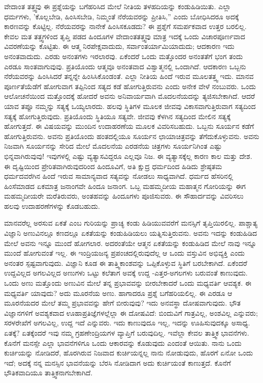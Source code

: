 ವೇದಾಂತ ತತ್ತ್ವವು ಈ ಪ್ರಶ್ನೆಯನ್ನು ಬಗೆಹರಿಸಿದ ಮೇಲೆ ನೀತಿಯ ತಳಹದಿಯನ್ನು ಕಂಡುಹಿಡಿಯಿತು. ಎಲ್ಲಾ ಧರ್ಮಗಳು, 'ಕೊಲ್ಲಬೇಡಿ, ಹಿಂಸಿಸಬೇಡಿ, ನಿಮ್ಮಂತೆ ನೆರೆಯವರನ್ನು ಪ್ರೀತಿಸಿ,'' ಎಂದು ಬೋಧಿಸಿದರೂ ಅದಕ್ಕೆ ಕಾರಣವನ್ನು ಕೊಟ್ಟಿಲ್ಲ. ನೆರೆಯವರನ್ನು ನಾನೇಕೆ ಹಿಂಸಿಸಕೂಡದು? ಈ ಪ್ರಶ್ನೆಗೆ ಸಮರ್ಪಕವಾದ ಉತ್ತರ ಬರಲಿಲ್ಲ. ಕೇವಲ ಮತ ತತ್ತ್ವಗಳಿಂದ ತೃಪ್ತಿ ಪಡದ ಹಿಂದೂಗಳ ವೇದಾಂತತತ್ತ್ವವು ಮಾತ್ರ ಇದಕ್ಕೆ ಒಂದು ವಿಚಾರಪೂರ್ಣವಾದ ವಿವರಣೆಯನ್ನು ಕೊಟ್ಟಿತು. ಈ ಆತ್ಮ ನಿರಪೇಕ್ಷವಾದುದು, ಸರ್ವಾಂತರ್ಯಾಮಿಯಾದುದು; ಆದಕಾರಣ ಇದು ಅನಂತವಾದುದು. ಎರಡು ಅನಂತಗಳು ಇರಲಾರವು. ಏಕೆಂದರೆ ಒಂದು ಮತ್ತೊಂದರ ಅನಂತತೆಗೆ ಭಂಗ ತಂದು ಎರಡೂ ಸಾಂತವಾಗುವುವು. ಪ್ರತಿಯೊಂದು ಆತ್ಮವೂ ಅನಂತವಾದ ವಿಶ್ವಾತ್ಮನಲ್ಲಿ ಒಂದಾಗಿದೆ. ಆದಕಾರಣ ಒಬ್ಬನು ನೆರೆಯವರನ್ನು ಹಿಂಸಿಸಿದರೆ ತನ್ನನ್ನೇ ಹಿಂಸಿಸಿಕೊಂಡಂತೆ. ಎಲ್ಲಾ ನೀತಿಯ ಹಿಂದೆ ಇರುವ ಮೂಲತತ್ತ್ವ ಇದು. ಮಾನವ ಪೂರ್ಣತೆಯೆಡೆಗೆ ಹೋಗುವಾಗ ತಪ್ಪಿನಿಂದ ಸತ್ಯದ ಕಡೆ ಹೋಗುತ್ತಿರುವನು ಎಂದು ಅನೇಕ ವೇಳೆ ನಂಬುವರು. ಒಂದು ಆಲೋಚನೆಯಿಂದ ಮತ್ತೊಂದಕ್ಕೆ ಹೋದರೆ ಅವನು ಅನಿವಾರ್ಯವಾಗಿ ಮೊದಲನೆಯದನ್ನು ತ್ಯಜಿಸಬೇಕಾಗಿದೆ. ಆದರೆ ಯಾವ ತಪ್ಪೂ ನಮ್ಮನ್ನು ಸತ್ಯಕ್ಕೆ ಒಯ್ಯಲಾರದು. ಹಲವು ಸ್ಥಿತಿಗಳ ಮೂಲಕ ಜೀವವು ವಿಕಾಸವಾಗುತ್ತಿರುವಾಗ ಸತ್ಯದಿಂದ ಸತ್ಯಕ್ಕೆ ಹೋಗುತ್ತಿರುವುದು. ಪ್ರತಿಯೊಂದು ಸ್ಥಿತಿಯೂ ಸತ್ಯವೇ. ಜೀವವು ಕೆಳಗಿನ ಸತ್ಯದಿಂದ ಮೇಲಿನ ಸತ್ಯಕ್ಕೆ ಹೋಗುತ್ತದೆ. ಈ ವಿಷಯವನ್ನು ಮುಂದಿನ ಉದಾಹರಣೆಯ ಮೂಲಕ ವಿವರಿಸಬಹುದು. ಒಬ್ಬನು ಸೂರ್ಯನ ಕಡೆಗೆ ಹೋಗುತ್ತಿರುವನು. ಅವನು ಪ್ರತಿಯೊಂದು ಹಂತದಲ್ಲಿಯೂ ಸೂರ್ಯನ ಛಾಯಾಚಿತ್ರವನ್ನು ತೆಗೆದುಕೊಳ್ಳುವನು. ಅವನು ನಿಜವಾಗಿ ಸೂರ್ಯನನ್ನು ಸೇರಿದ ಮೇಲೆ ಮೊದಲನೆಯ ಎರಡನೆಯ ಚಿತ್ರಗಳು ಸೂರ್ಯನಿಗಿಂತ ಎಷ್ಟು ಭಿನ್ನವಾಗಿರುವುವು! ಇವುಗಳಲ್ಲಿ ಎಷ್ಟು ವ್ಯತ್ಯಾಸವಿದ್ದರೂ ಎಲ್ಲವೂ ನಿಜ. ಈ ವ್ಯತ್ಯಾಸಕ್ಕೆಲ್ಲ ಕಾರಣ ಕಾಲ ಮತ್ತು ದೇಶ. ಈ ದೃಷ್ಟಿಯಿಂದ ಪ್ರೇರಿತವಾಗಿರುವುದರಿಂದ ಹಿಂದೂವಿಗೆ, ಅತಿ ಕ್ಷುದ್ರ ಧರ್ಮದಿಂದ ಹಿಡಿದು ಶ್ರೇಷ್ಠತಮ ಧರ್ಮದವರೆಗಿನ ಹಿಂದೆ ಇರುವ ಸಾಮಾನ್ಯವಾದ ಸತ್ಯವನ್ನು ನೋಡಲು ಸಾಧ್ಯವಾಗಿದೆ. ಧರ್ಮದ ಹೆಸರಿನಲ್ಲಿ ಹಿಂಸೆಮಾಡದ ಏಕಮಾತ್ರ ಜನಾಂಗವೇ ಹಿಂದೂ ಜನಾಂಗ. ಒಬ್ಬ ಮಹಮ್ಮದೀಯ ಮಹಾತ್ಮನ ಗೋರಿಯನ್ನು ಈಗ ಮಹಮ್ಮದೀಯರೇ ಮರೆತಿರುವರು, ಅಂತಹವನ್ನು ಹಿಂದೂಗಳು ಪೂಜಿಸುವರು. ಈ ಸೌಹಾರ್ದವನ್ನು ವಿವರಿಸಲು ಹಲವು ಉದಾಹರಣೆಗಳನ್ನು ಕೊಡಬಹುದು.

ಮಾನವರೆಲ್ಲ ಅರಸುವ ಏಕತೆ ಎಂಬ ಗುರಿಯನ್ನು ಪ್ರಾಚ್ಯ ಕಂಡು ಹಿಡಿಯುವವರೆಗೆ ಮನಸ್ಸಿಗೆ ತೃಪ್ತಿಯಿರಲಿಲ್ಲ. ಪಾಶ್ಚಾತ್ಯ ವಿಜ್ಞಾನಿ ಅಣುವಿನಲ್ಲೂ ಕಣದಲ್ಲೂ ಏಕತೆಯನ್ನು ಕಂಡುಹಿಡಿಯಲು ಯತ್ನಿಸುತ್ತಿರುವನು. ಅವನು ಇದನ್ನು ಕಂಡುಹಿಡಿದ ಮೇಲೆ ಅವನು ಇನ್ನೂ ಮುಂದೆ ಹೋಗಲಾರ. ಅದರಂತೆಯೇ ಆತ್ಮನ ಏಕತೆಯನ್ನು ಕಂಡುಹಿಡಿದ ಮೇಲೆ ನಾವು ಇನ್ನೂ ಮುಂದೆ ಹೋಗುವಂತೆ ಇಲ್ಲ. ಈ ಇಂದ್ರಿಯಜನ್ಯ ಪ್ರಪಂಚದಲ್ಲಿರುವುದೆಲ್ಲ ಆ ಒಂದು ವಸ್ತುವಿನ ಅಭಿವ್ಯಕ್ತಿ ಎಂದು ಅನಂತರ ಸ್ಪಷ್ಟವಾಗುವುದು. ವಿಜ್ಞಾನಿ ಕೂಡ ಈ ತಾತ್ತ್ವಿಕಾಂಶವನ್ನು ಒಪ್ಪಿಕೊಳ್ಳುವ ಸ್ಥಿತಿಗೆ ಬರಬೇಕಾಗಿದೆ. ಏಕೆಂದರೆ ಉದ್ದವಿಲ್ಲದ ಅಗಲವಿಲ್ಲದ ಅಣುಗಳು ಒಟ್ಟು ಕಲೆತಾಗ ಅವಕ್ಕೆ ಉದ್ದ -ಎತ್ತರ-ಅಗಲಗಳು ಬರುವಂತೆ ಕಾಣುವುದು. ಒಂದು ಅಣು ಮತ್ತೊಂದು ಅಣುವಿನ ಮೇಲೆ ತನ್ನ ಪ್ರಭಾವವನ್ನು ಬೀರಬೇಕಾದರೆ ಒಂದು ಮಧ್ಯವರ್ತಿ ಆವಶ್ಯಕ. ಈ ಮಧ್ಯವರ್ತಿ ಯಾವುದು? ಅದು ಮೂರನೆಯ ಅಣು. ಹಾಗಾದರೂ ಪ್ರಶ್ನೆ ಬಗೆಹರಿಯಲಿಲ್ಲ. ಈ ಎರಡೂ ಆ ಮೂರನೆಯದರ ಮೇಲೆ ತಮ್ಮ ಪ್ರಭಾವವನ್ನು ಹೇಗೆ ಬೀರುವುವು? ಇದು ಅನವಸ್ಥಾ ದೋಷವಾಗುವುದು. ಭೌತ ವಿಜ್ಞಾನಗಳಿಗೆ ಅವಶ್ಯಕವಾದ ಊಹಾಪ್ರತಿಜ್ಞೆಗಳಲ್ಲೆಲ್ಲಾ ಈ ದೋಷವಿದೆ: ಬಿಂದುವಿಗೆ ಗಾತ್ರವಿಲ್ಲ, ಅಂಶವಿಲ್ಲ ಎನ್ನುವರು; ಸರಳರೇಖೆಗೆ ಅಗಲವಿಲ್ಲ, ಉದ್ದ ಇದೆ ಎನ್ನುವರು. ಇದು ಕಾಣುವುದೂ ಇಲ್ಲ, ಇದನ್ನು ಊಹಿಸುವುದಕ್ಕೂ ಅಸಾಧ್ಯ. ಏತಕ್ಕೆ? ಏತಕ್ಕೆಂದರೆ ಇವು ನಮ್ಮ ಗ್ರಹಣೇಂದ್ರಿಯಗಳ ವ್ಯಾಪ್ತಿಗೆ ಬರುವುದಿಲ್ಲ. ಇವೆಲ್ಲಾ ಕೇವಲ ತಾತ್ತ್ವಿಕ ಭಾವನೆಗಳು. ಕೊನೆಗೆ ಮನಸ್ಸೇ ಎಲ್ಲಾ ಭಾವನೆಗಳಿಗೂ ಒಂದು ಆಕಾರವನ್ನು ಕೊಡುವುದು ಎಂದಂತೆ ಆಯಿತು. ನಾನು ಒಂದು ಕುರ್ಚಿಯನ್ನು ನೋಡಿದರೆ, ಹೊರಗಿರುವ ನಿಜವಾದ ಕುರ್ಚಿಯನ್ನಲ್ಲ ನಾನು ನೋಡುವುದು, ಹೊರಗೆ ಏನೋ ಒಂದು ಇದೆ; ಅದಕ್ಕೆ ನನ್ನ ಮನಸ್ಸಿನ ಭಾವನೆಯನ್ನು ಬೆರಸಿ ನೋಡಿದಾಗ ಅದು ಕುರ್ಚಿಯಂತೆ ಕಾಣುತ್ತದೆ. ಕೊನೆಗೆ ಭೌತಿಕವಾದಿಯೂ ತಾತ್ತ್ವಿಕನಾಗಬೇಕಾಗಿದೆ.

